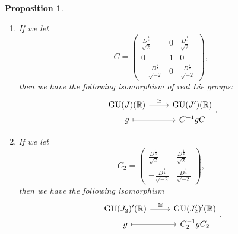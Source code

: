 \documentclass[11pt, a4paper]{amsart}
\theoremstyle{plain}
\newtheorem{proposition}[theorem]{Proposition}
\theoremstyle{definition}
\numberwithin{equation}{section}
\def\RR{\mathbb{R}}
\DeclareMathOperator{\GU}{GU}
\begin{document}
\begin{proposition}
    \begin{enumerate}
        \item If we let 
              \begin{equation*}
                  C = \begin{pmatrix}
                         \frac{D^{\frac{1}{4}}}{\sqrt{2}} & 0 & \frac{D^{\frac{1}{4}}}{\sqrt{2}} \\
                         0 & 1 & 0 \\
                          -\frac{D^{\frac{1}{4}}}{\sqrt{-2}} & 0 & \frac{D^{\frac{1}{4}}}{\sqrt{-2}}
                      \end{pmatrix}, 
              \end{equation*}
              then we have the following isomorphism of real Lie groups: 
              \begin{equation*}
                  \begin{tikzcd}[row sep = 0]
                   \GU(J)(\RR)  \ar[r, "\cong"] & \GU(J^{\prime})(\RR) \\
                      g \ar[r, mapsto] & C^{-1}gC
                  \end{tikzcd}. 
              \end{equation*}
        \item If we let 
              \begin{equation*}
                  C_2 = \begin{pmatrix}
                         \frac{D^{\frac{1}{4}}}{\sqrt{2}} & \frac{D^{\frac{1}{4}}}{\sqrt{2}} \\
                          -\frac{D^{\frac{1}{4}}}{\sqrt{-2}} &  \frac{D^{\frac{1}{4}}}{\sqrt{-2}}
                      \end{pmatrix}, 
              \end{equation*}
              then we have the following isomorphism 
              \begin{equation*}
                  \begin{tikzcd}[row sep = 0]
                   \GU(J_{2})^{\prime}(\RR)  \ar[r, "\cong"] & \GU(J_{2}^{\prime})^{\prime}(\RR) \\
                      g \ar[r, mapsto] & C_{2}^{-1}gC_{2}
                  \end{tikzcd}. 
              \end{equation*}
    \end{enumerate}
\end{proposition}
\end{document}
